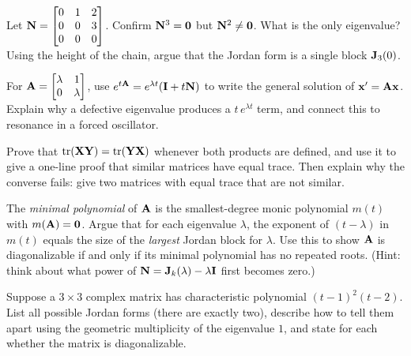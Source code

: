 \begin{exercise}
\label{ch28:ex-nilpotent}
Let $\mathbf{N}=\begin{bmatrix}0&1&2\\0&0&3\\0&0&0\end{bmatrix}$. Confirm $\mathbf{N}^3=\mathbf{0}$
but $\mathbf{N}^2\neq\mathbf{0}$. What is the only eigenvalue? Using the height of the chain,
argue that the Jordan form is a single block $\mathbf{J}_3(0)$.
\end{exercise}

\begin{exercise}
\label{ch28:ex-ode}
For $\mathbf{A}=\begin{bmatrix}\lambda&1\\0&\lambda\end{bmatrix}$, use
$e^{t\mathbf{A}}=e^{\lambda t}(\mathbf{I}+t\mathbf{N})$ to write the general solution of
$\mathbf{x}'=\mathbf{A}\mathbf{x}$. Explain why a defective eigenvalue produces a
$t\,e^{\lambda t}$ term, and connect this to resonance in a forced oscillator.
\end{exercise}

\begin{exercise}
\label{ch28:ex-trace-proof}
Prove that $\operatorname{tr}(\mathbf{X}\mathbf{Y})=\operatorname{tr}(\mathbf{Y}\mathbf{X})$ whenever both products are defined, and use
it to give a one-line proof that similar matrices have equal trace. Then explain why the
converse fails: give two matrices with equal trace that are not similar.
\end{exercise}

\begin{exercise}
\label{ch28:ex-minpoly}
The \emph{minimal polynomial} of $\mathbf{A}$ is the smallest-degree monic polynomial $m(t)$
with $m(\mathbf{A})=\mathbf{0}$. Argue that for each eigenvalue $\lambda$, the exponent of
$(t-\lambda)$ in $m(t)$ equals the size of the \emph{largest} Jordan block for $\lambda$.
Use this to show $\mathbf{A}$ is diagonalizable if and only if its minimal polynomial has no
repeated roots. (Hint: think about what power of $\mathbf{N}=\mathbf{J}_k(\lambda)-\lambda\mathbf{I}$
first becomes zero.)
\end{exercise}

\begin{exercise}
\label{ch28:ex-classify}
Suppose a $3\times3$ complex matrix has characteristic polynomial $(t-1)^2(t-2)$. List
all possible Jordan forms (there are exactly two), describe how to tell them apart using
the geometric multiplicity of the eigenvalue $1$, and state for each whether the matrix is
diagonalizable.
\end{exercise}
